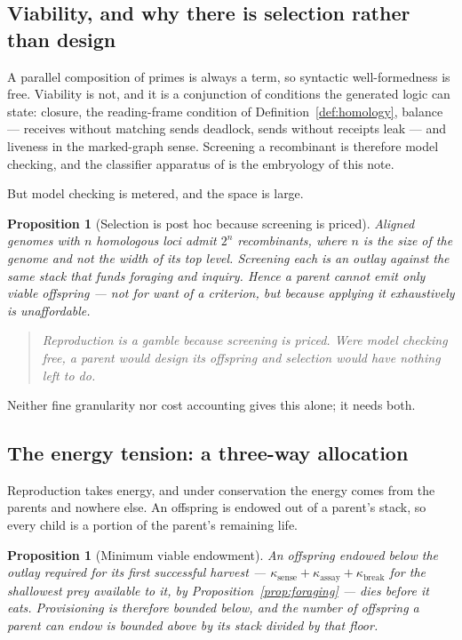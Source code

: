\documentclass[11pt]{article}
\theoremstyle{plain}
\newtheorem{proposition}[theorem]{Proposition}
\theoremstyle{definition}
\begin{document}
\subsection{Viability, and why there is selection rather than design}
\label{sec:viability}

A parallel composition of primes is always a term, so syntactic well-formedness is free. Viability is
not, and it is a conjunction of conditions the generated logic can state: closure, the reading-frame
condition of Definition~\ref{def:homology}, balance --- receives without matching sends deadlock,
sends without receipts leak --- and liveness in the marked-graph sense. Screening a recombinant is
therefore model checking, and the classifier apparatus of \cite{ClassifierNote} is the embryology of
this note.

But model checking is metered, and the space is large.

\begin{proposition}[Selection is post hoc because screening is priced]
\label{prop:selection}
Aligned genomes with $n$ homologous loci admit $2^n$ recombinants, where $n$ is the size of the genome
and not the width of its top level. Screening each is an outlay against the same stack that funds
foraging and inquiry. Hence a parent cannot emit only viable offspring --- not for want of a
criterion, but because applying it exhaustively is unaffordable.
\end{proposition}

\begin{quote}
\itshape Reproduction is a gamble because screening is priced. Were model checking free, a parent
would design its offspring and selection would have nothing left to do.
\end{quote}

Neither fine granularity nor cost accounting gives this alone; it needs both.

\subsection{The energy tension: a three-way allocation}
\label{sec:energy}

Reproduction takes energy, and under conservation the energy comes from the parents and nowhere else.
An offspring is endowed out of a parent's stack, so every child is a portion of the parent's remaining
life.

\begin{proposition}[Minimum viable endowment]
\label{prop:endowment}
An offspring endowed below the outlay required for its first successful harvest ---
$\kappa_{\mathrm{sense}} + \kappa_{\mathrm{assay}} + \kappa_{\mathrm{break}}$ for the shallowest prey
available to it, by Proposition~\ref{prop:foraging} --- dies before it eats. Provisioning is therefore
bounded below, and the number of offspring a parent can endow is bounded above by its stack divided by
that floor.
\end{proposition}
\end{document}
